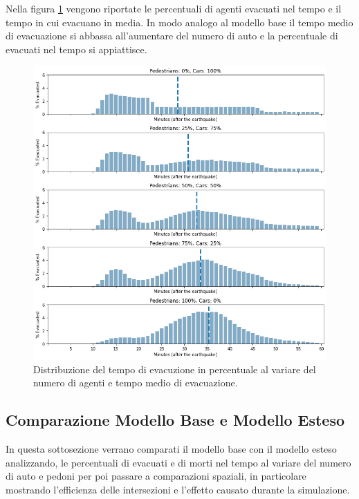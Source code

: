 \pagebreak

Nella figura \ref{fig:analisi-new-evtimes} vengono riportate le percentuali di agenti evacuati nel tempo
e il tempo in cui evacuano in media.
%
In modo analogo al modello base il tempo medio di evacuazione si abbassa all'aumentare del numero di auto e 
la percentuale di evacuati nel tempo si appiattisce.

\begin{figure}
    \centering
    \includegraphics[width=\textwidth]{images/analisi/new-evtimes.png}
    \caption{Distribuzione del tempo di evacuzione in percentuale al variare del numero di agenti e tempo medio di evacuazione.}
    \label{fig:analisi-new-evtimes}
\end{figure}

\pagebreak

\subsection{Comparazione Modello Base e Modello Esteso}
In questa sottosezione verrano comparati il modello base con il modello esteso analizzando,
le percentuali di evacuati e di morti nel tempo al variare del numero di auto e pedoni per poi passare a comparazioni spaziali,
in particolare mostrando l'efficienza delle intersezioni e l'effetto causato durante la simulazione.

